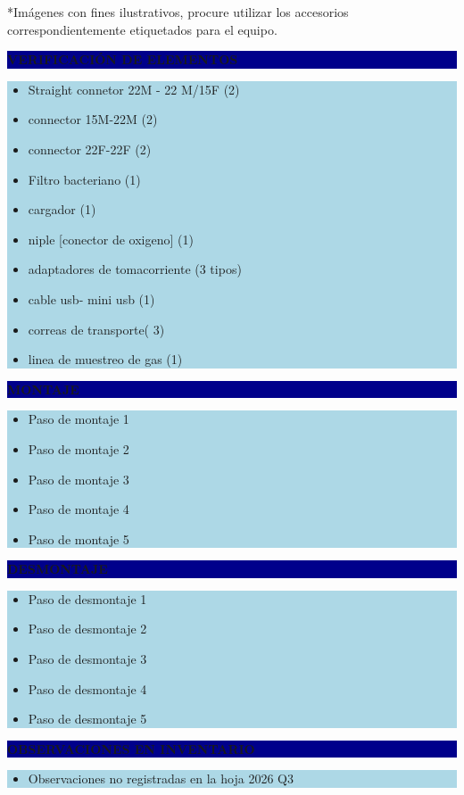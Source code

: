 \documentclass[11pt]{article}
\newcommand{\seccionbanda}[1]{%
  \vspace{0.6em}
  \noindent\colorbox{darkblue}{\parbox{\dimexpr\linewidth-2\fboxsep}{%
    \centering\color{white}\bfseries #1}}\par\vspace{0.6em}
}
\begin{document}
\vspace{0.5em}
\footnotesize{*Imágenes con fines ilustrativos, procure utilizar los accesorios correspondientemente etiquetados para el equipo.}
\normalsize

\newpage
\seccionbanda{VERIFICACIÓN DE ELEMENTOS}
\noindent\colorbox{lightblue}{\parbox{\dimexpr\linewidth-2\fboxsep\relax}{%
\begin{itemize}[label=$\square$, itemsep=4pt]
\item Straight connetor 22M - 22 M/15F (2)
\item connector 15M-22M (2)
\item connector 22F-22F (2)
\item Filtro bacteriano (1)
\item cargador (1)
\item niple [conector de oxigeno] (1)
\item adaptadores de tomacorriente (3 tipos)
\item cable usb- mini usb (1)
\item correas de transporte( 3)
\item linea de muestreo de gas (1)
\end{itemize}
}}\par

\seccionbanda{MONTAJE}
\noindent\colorbox{lightblue}{\parbox{\dimexpr\linewidth-2\fboxsep\relax}{%
\begin{itemize}[label=$\square$, itemsep=4pt]
\item Paso de montaje 1
\item Paso de montaje 2
\item Paso de montaje 3
\item Paso de montaje 4
\item Paso de montaje 5
\end{itemize}
}}\par

\seccionbanda{DESMONTAJE}
\noindent\colorbox{lightblue}{\parbox{\dimexpr\linewidth-2\fboxsep\relax}{%
\begin{itemize}[label=$\square$, itemsep=4pt]
\item Paso de desmontaje 1
\item Paso de desmontaje 2
\item Paso de desmontaje 3
\item Paso de desmontaje 4
\item Paso de desmontaje 5
\end{itemize}
}}\par
\seccionbanda{OBSERVACIONES EN INVENTARIO}
\noindent\colorbox{lightblue}{\parbox{\dimexpr\linewidth-2\fboxsep\relax}{\begin{itemize}[itemsep=4pt]
\item Observaciones no registradas en la hoja 2026 Q3
\end{itemize}}}\par
\end{document}
